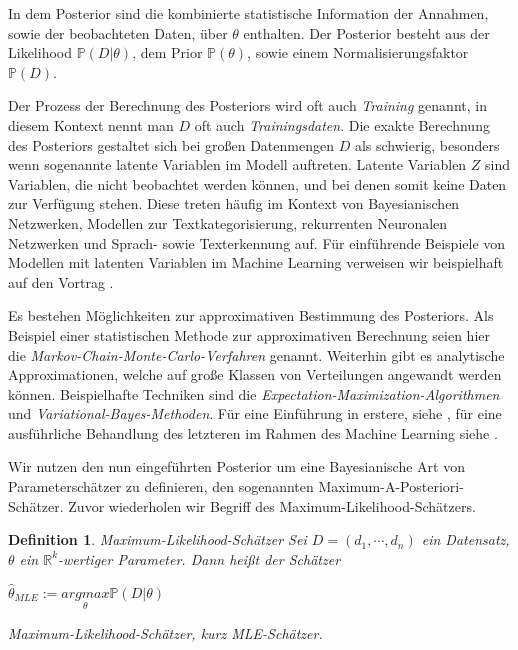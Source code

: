 \documentclass{report}
\theoremstyle{linebreak}
\newtheorem{defi}{Definition}%
\begin{document}
In dem Posterior sind die kombinierte statistische Information der Annahmen, sowie der beobachteten Daten, über $\theta$ enthalten. Der Posterior besteht aus der Likelihood $\mathbb{P}(D\vert \theta)$, dem Prior $\mathbb{P}(\theta)$, sowie einem Normalisierungsfaktor $\mathbb{P}(D)$. 

Der Prozess der Berechnung des Posteriors wird oft auch \textit{Training} genannt, in diesem Kontext nennt man $D$ oft auch \textit{Trainingsdaten}. Die exakte Berechnung des Posteriors gestaltet sich bei großen Datenmengen $D$ als schwierig, besonders wenn sogenannte latente Variablen im Modell auftreten. Latente Variablen $Z$ sind Variablen, die nicht beobachtet werden können, und bei denen somit keine Daten zur Verfügung stehen. Diese treten häufig im Kontext von Bayesianischen Netzwerken, Modellen zur Textkategorisierung, rekurrenten Neuronalen Netzwerken und Sprach- sowie Texterkennung auf. Für einführende Beispiele von Modellen mit latenten Variablen im Machine Learning verweisen wir beispielhaft auf den Vortrag \cite{Latent_Variables}. 

Es bestehen Möglichkeiten zur approximativen Bestimmung des Posteriors. Als Beispiel einer statistischen Methode zur approximativen Berechnung seien hier die \textit{Markov-Chain-Monte-Carlo-Verfahren} genannt. Weiterhin gibt es analytische Approximationen, welche auf große Klassen von Verteilungen angewandt werden können. Beispielhafte Techniken sind die \textit{Expectation-Maximization-Algorithmen} und \textit{Variational-Bayes-Methoden}. Für eine Einführung in erstere, siehe \cite{Exp_Max}, für eine ausführliche Behandlung des letzteren im Rahmen des Machine Learning siehe \cite{Var_Bayes}. 




Wir nutzen den nun eingeführten Posterior um eine Bayesianische Art von Parameterschätzer zu definieren, den sogenannten Maximum-A-Posteriori-Schätzer. Zuvor wiederholen wir Begriff des Maximum-Likelihood-Schätzers.

\begin{defi}{Maximum-Likelihood-Schätzer}
	Sei $D = (d_1, \cdots, d_n)$ ein Datensatz, $\theta$ ein $\mathbb{R}^k$-wertiger 
	Parameter. Dann heißt der Schätzer
	\begin{center}
		$\hat{\theta}_{MLE} := \underset{\theta}{arg max} \mathbb{P}(D \vert \theta)$
	\end{center}
	\textit{Maximum-Likelihood-Schätzer}, kurz \textit{MLE-Schätzer}.
\end{defi}
\end{document}
